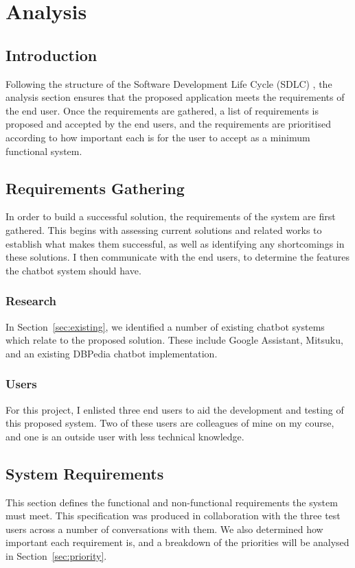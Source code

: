 \chapter{Analysis}
\section{Introduction}
Following the structure of the Software Development Life Cycle (SDLC) , the analysis section ensures that the proposed application meets the requirements of the end user. Once the requirements are gathered, a list of requirements is proposed and accepted by the end users, and the requirements are prioritised according to how important each is for the user to accept as a minimum functional system. 

\section{Requirements Gathering}
In order to build a successful solution, the requirements of the system are first gathered. This begins with assessing current solutions and related works to establish what makes them successful, as well as identifying any shortcomings in these solutions. I then communicate with the end users, to determine the features the chatbot system should have.

\subsection{Research}
In Section~\ref{sec:existing}, we identified a number of existing chatbot systems which relate to the proposed solution. These include Google Assistant, Mitsuku, and an existing DBPedia chatbot implementation.

\subsection{Users}
For this project, I enlisted three end users to aid the development and testing of this proposed system. Two of these users are colleagues of mine on my course, and one is an outside user with less technical knowledge.

\newpage
\section{System Requirements}
This section defines the functional and non-functional requirements the system must meet. This specification was produced in collaboration with the three test users across a number of conversations with them. We also determined how important each requirement is, and a breakdown of the priorities will be analysed in Section~\ref{sec:priority}.

